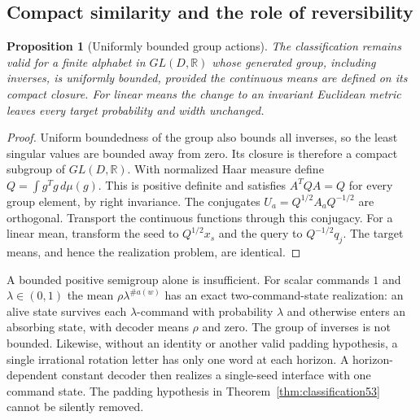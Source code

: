 \documentclass[11pt]{amsart}
\numberwithin{equation}{section}
\newtheorem{proposition}[theorem]{Proposition}
\theoremstyle{definition}
\theoremstyle{remark}
\newcommand{\R}{\mathbb R}
\begin{document}
\subsection{Compact similarity and the role of reversibility}
\begin{proposition}[Uniformly bounded group actions]\label{prop:similarity53}
The classification remains valid for a finite alphabet in $GL(D,\R)$ whose generated group, including inverses, is uniformly bounded, provided the continuous means are defined on its compact closure. For linear means the change to an invariant Euclidean metric leaves every target probability and width unchanged.
\end{proposition}
\begin{proof}
Uniform boundedness of the group also bounds all inverses, so the least singular values are bounded away from zero. Its closure is therefore a compact subgroup of $GL(D,\R)$. With normalized Haar measure define $Q=\int g^Tg\,d\mu(g)$. This is positive definite and satisfies $A^TQA=Q$ for every group element, by right invariance. The conjugates $U_a=Q^{1/2}A_aQ^{-1/2}$ are orthogonal. Transport the continuous functions through this conjugacy. For a linear mean, transform the seed to $Q^{1/2}x_s$ and the query to $Q^{-1/2}q_j$. The target means, and hence the realization problem, are identical.
\end{proof}
A bounded positive semigroup alone is insufficient. For scalar commands $1$ and $\lambda\in(0,1)$ the mean $\rho\lambda^{\#a(w)}$ has an exact two-command-state realization: an alive state survives each $\lambda$-command with probability $\lambda$ and otherwise enters an absorbing state, with decoder means $\rho$ and zero. The group of inverses is not bounded. Likewise, without an identity or another valid padding hypothesis, a single irrational rotation letter has only one word at each horizon. A horizon-dependent constant decoder then realizes a single-seed interface with one command state. The padding hypothesis in Theorem~\ref{thm:classification53} cannot be silently removed.
\end{document}
